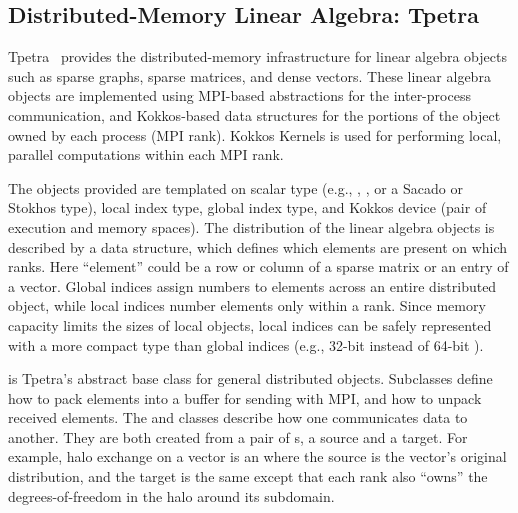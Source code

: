\subsection{Distributed-Memory Linear Algebra: Tpetra}\label{subsec:tpetra}
Tpetra~\cite{Baker2012,hoemmen2015tpetra} provides the distributed-memory
infrastructure for linear algebra objects such as sparse graphs,
sparse matrices, and dense vectors. These linear algebra objects are
implemented using MPI-based abstractions for the inter-process communication,
and Kokkos-based data structures for the portions of the object
owned by each process (MPI rank). Kokkos Kernels is used for
performing local, parallel computations within each MPI rank.

The objects provided are templated on scalar type (e.g., , , or a Sacado or Stokhos type), local index type, global index type, and Kokkos device (pair of execution and memory spaces).
The distribution of the linear algebra objects is described by a  data structure, which defines which elements are present on which ranks.
Here ``element'' could be a row or column of a sparse matrix or an entry of a vector.
Global indices assign numbers to elements across an entire distributed object, while local indices number elements only within a rank.
Since memory capacity limits the sizes of local objects, local indices can be safely represented with a more compact type than global indices (e.g., 32-bit  instead of 64-bit ).

 is Tpetra's abstract base class for general distributed objects.
Subclasses define how to pack elements into a buffer for sending with MPI, and how to unpack received elements.
The  and  classes describe how one  communicates data to another.
They are both created from a pair of s, a source and a target. For example, halo exchange on a vector is an  where
the source is the vector's original distribution, and the target is the same except that each rank
also ``owns'' the degrees-of-freedom in the halo around its subdomain.

